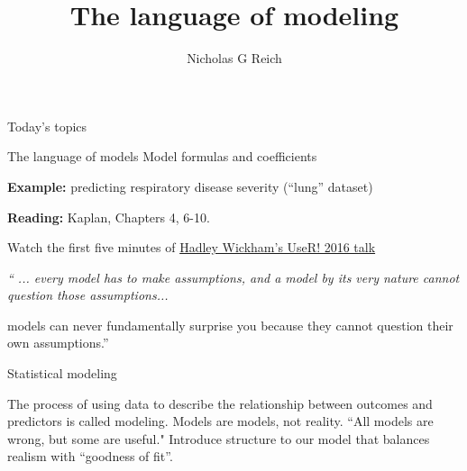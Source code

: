 \documentclass[table]{beamer}\usepackage[]{graphicx}\usepackage[]{color}
\title{The language of modeling}
\author{Nicholas G Reich}
\begin{document}
\begin{frame}[plain]
	\titlepage
\end{frame}











\begin{frame}{Today's topics}

\bi
    \myitem The language of models
    \myitem Model formulas and coefficients 
\ei

\bigskip

{\bf Example:} predicting respiratory disease severity (``lung'' dataset)

\bigskip

{\bf Reading:} Kaplan, Chapters 4, 6-10.


\end{frame}


\begin{frame}%

 Watch the first five minutes of \href{https://channel9.msdn.com/Events/useR-international-R-User-conference/useR2016/Towards-a-grammar-of-interactive-graphics}{Hadley Wickham's UseR! 2016 talk}

\vspace{1cm} 

\centering
\em
  `` ... every model has to make assumptions, and a model by its very nature cannot question those assumptions...

\vspace{1cm} 
  
 models can never fundamentally surprise you because they cannot question their own assumptions.'' %


\end{frame}


\begin{frame}{Statistical modeling}

The process of using data to describe the relationship between outcomes and predictors is called modeling.
\bi
  \myitem Models are models, not reality.
  \myitem ``All models are wrong, but some are useful." 
  \myitem Introduce structure to our model that balances realism with ``goodness of fit''. 
\ei

\end{frame}
\end{document}
